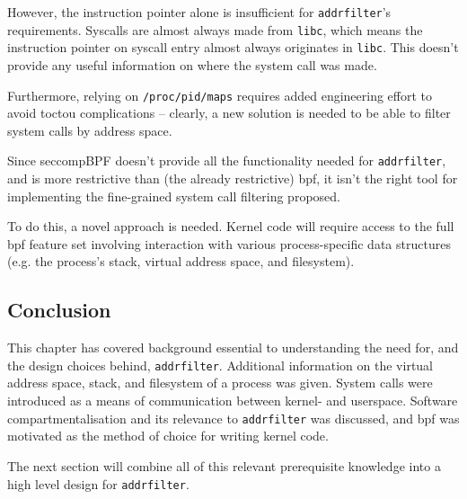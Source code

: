 However, the instruction pointer alone is insufficient for \texttt{addrfilter}'s
requirements. Syscalls are almost always made from \texttt{libc}, which means the instruction
pointer on syscall entry almost always originates in \texttt{libc}. This doesn't
provide any useful information on where the system call was made. 

Furthermore, relying on \texttt{/proc/pid/maps} requires added engineering
effort to avoid \ac{toctou} complications -- clearly, a new solution is needed
to be able to filter system calls by address space. 

Since seccompBPF doesn't provide all the functionality needed for 
\texttt{addrfilter}, and is more restrictive than (the already restrictive) 
\ac{bpf}, it isn't the right tool for implementing the fine-grained system
call filtering proposed.

To do this, a novel approach is needed. Kernel code will require access to the full
\ac{bpf} feature set involving interaction with various process-specific data
structures (e.g. the process's stack, virtual address space, and filesystem).

\subsection{Conclusion}

This chapter has covered background essential to understanding the need for, and
the design choices behind, \texttt{addrfilter}. Additional information on the
virtual address space, stack, and filesystem of a process was given. System
calls were introduced as a means of communication between kernel- and userspace.
Software compartmentalisation and its relevance to \texttt{addrfilter} was
discussed, and \ac{bpf} was motivated as the method of choice for writing kernel
code. 

The next section will combine all of this relevant prerequisite knowledge into a
high level design for \texttt{addrfilter}. 
